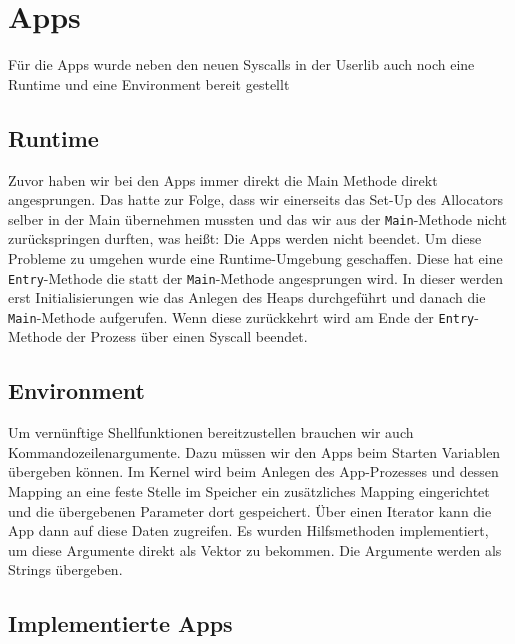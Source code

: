 \section{Apps}
Für die Apps wurde neben den neuen Syscalls in der Userlib auch noch eine Runtime und eine Environment bereit gestellt

\subsection{Runtime}
    Zuvor haben wir bei den Apps immer direkt die Main Methode direkt angesprungen. Das hatte zur Folge, dass wir einerseits das Set-Up des Allocators selber in der Main übernehmen mussten und das wir aus der \verb|Main|-Methode nicht zurückspringen durften, was heißt: Die Apps werden nicht beendet. Um diese Probleme zu umgehen wurde eine Runtime-Umgebung geschaffen. Diese hat eine \verb|Entry|-Methode die statt der \verb|Main|-Methode angesprungen wird. In dieser werden erst Initialisierungen wie das Anlegen des Heaps durchgeführt und danach die \verb|Main|-Methode aufgerufen. Wenn diese zurückkehrt wird am Ende der \verb|Entry|-Methode der Prozess über einen Syscall beendet.

\subsection{Environment}
    Um vernünftige Shellfunktionen bereitzustellen brauchen wir auch Kommandozeilenargumente. Dazu müssen wir den Apps beim Starten Variablen übergeben können. Im Kernel wird beim Anlegen des App-Prozesses und dessen Mapping an eine feste Stelle im Speicher ein zusätzliches Mapping eingerichtet und die übergebenen Parameter dort gespeichert. Über einen Iterator kann die App dann auf diese Daten zugreifen. Es wurden Hilfsmethoden implementiert, um diese Argumente direkt als Vektor zu bekommen. Die Argumente werden als Strings übergeben.

\subsection{Implementierte Apps}